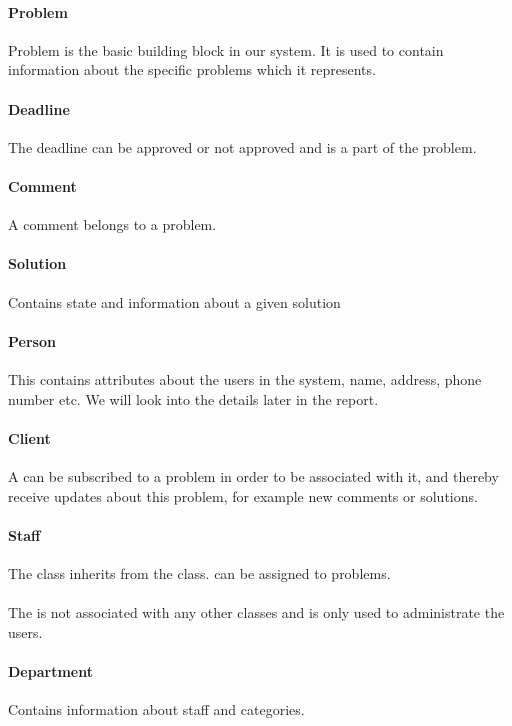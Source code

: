 \paragraph{Problem}
Problem is the basic building block in our system. It is used to contain information about the specific problems which it represents.

\paragraph{Deadline} The deadline can be approved or not approved and is a part of the problem. 

\paragraph{Comment} A comment belongs to a problem. 

\paragraph{Solution}
Contains state and information about a given solution

\paragraph{Person}
This contains attributes about the users in the system, name, address, phone number etc. We will look into the details later in the report.

\paragraph{Client} A \aclient[] can be subscribed to a problem in order to be associated with it, and thereby receive updates about this problem, for example new comments or solutions.
 
\paragraph{Staff}
The \astaff[] class inherits from the \aclient[] class.
\astaff[] can be assigned to problems. 

\paragraph{\Admin[]} The \admin[] is not associated with any other classes and is only used to administrate the users. 

\paragraph{Department}
Contains information about staff and categories. 

